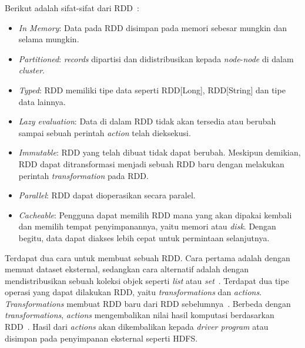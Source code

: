 Berikut adalah sifat-sifat dari RDD~\cite{holdenkarau:07:ls}:
\begin{itemize}

\item \textit{In Memory}: Data pada RDD disimpan pada memori sebesar mungkin dan selama mungkin.

\item \textit{Partitioned}: \textit{records} dipartisi dan didistribusikan kepada \textit{node}-\textit{node} di dalam \textit{cluster}.

\item \textit{Typed}: RDD memiliki tipe data seperti RDD[Long], RDD[String] dan tipe data lainnya.

\item \textit{Lazy evaluation}: Data di dalam RDD tidak akan tersedia atau berubah sampai sebuah perintah \textit{action} telah dieksekusi.

\item \textit{Immutable}: RDD yang telah dibuat tidak dapat berubah. Meskipun demikian, RDD dapat ditransformasi menjadi sebuah RDD baru dengan melakukan perintah \textit{transformation} pada RDD.

\item \textit{Parallel}: RDD dapat dioperasikan secara paralel.

\item \textit{Cacheable}: Pengguna dapat memilih RDD mana yang akan dipakai kembali dan memilih tempat penyimpanannya, yaitu memori atau \textit{disk}. Dengan begitu, data dapat diakses lebih cepat untuk permintaan selanjutnya.\\

\end{itemize}

Terdapat dua cara untuk membuat sebuah RDD. Cara pertama adalah dengan memuat dataset eksternal, sedangkan cara alternatif adalah dengan mendistribusikan sebuah koleksi objek seperti \textit{list} atau \textit{set}~\cite{holdenkarau:07:ls}. Terdapat dua tipe operasi yang dapat dilakukan RDD, yaitu \textit{transformations} dan \textit{actions}. \textit{Transformations} membuat RDD baru dari RDD sebelumnya~\cite{holdenkarau:07:ls}. Berbeda dengan \textit{transformations}, \textit{actions} mengembalikan nilai hasil komputasi berdasarkan RDD~\cite{holdenkarau:07:ls}. Hasil dari \textit{actions} akan dikembalikan kepada \textit{driver program} atau disimpan pada penyimpanan eksternal seperti HDFS.\\

